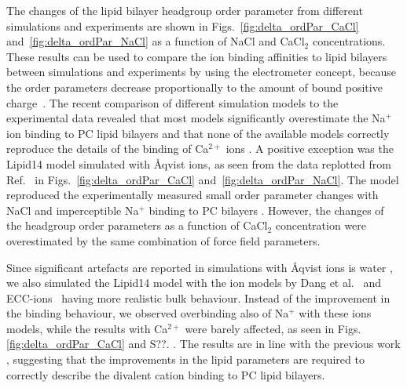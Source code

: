 \documentclass[aip,jcp,twocolumn]{revtex4}
\begin{document}
The changes of the lipid bilayer headgroup order parameter from different simulations and
experiments \cite{akutsu81,altenbach84} are shown in Figs.~\ref{fig:delta_ordPar_CaCl} and~\ref{fig:delta_ordPar_NaCl}
as a function of NaCl and CaCl$_2$ concentrations.
These results can be used to compare the ion binding affinities to lipid bilayers
between simulations and experiments by using the electrometer concept, because 
the order parameters decrease proportionally to the amount of bound positive charge~\cite{seelig87,catte16}. 
The recent comparison of different simulation models to the experimental data
revealed that most models significantly overestimate the Na$^+$ ion binding to PC
lipid bilayers and that none of the available models correctly reproduce
the details of the binding of Ca$^{2+}$ ions \cite{catte16}.
A positive exception was the Lipid14 model \cite{dickson14} simulated with \AA{}qvist ions,
as seen from the data replotted from Ref.~ in Figs.~\ref{fig:delta_ordPar_CaCl} and~\ref{fig:delta_ordPar_NaCl}.
The model reproduced the experimentally measured small order parameter changes with NaCl
and imperceptible Na$^+$ binding to PC bilayers \cite{akutsu81,altenbach84}.
However, the changes of the headgroup order parameters as a function of CaCl$_2$ 
concentration were overestimated by the same combination of force field parameters.

Since significant artefacts are reported in simulations with \AA{}qvist ions is water \cite{auffinger07},
we also simulated the Lipid14 model with the ion models by Dang et al.~\cite{smith94,chang1999,dang2006} and
ECC-ions~\cite{jungwirth17-new-paper-to-be-published, Pluharova2014} having
more realistic bulk behaviour. Instead of the improvement in the binding behaviour,
we observed overbinding also of Na$^+$ with these ions models, while the results
with Ca$^{2+}$ were barely affected,
as seen in Figs. \ref{fig:delta_ordPar_CaCl} and S??.%
.
The results are in line with the previous work \cite{catte16},
suggesting that the improvements in the lipid parameters are
required to correctly describe the divalent cation binding to PC lipid bilayers.
\end{document}
